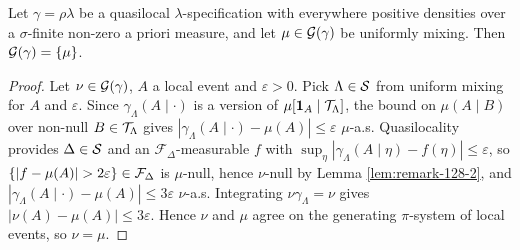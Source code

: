 \begin{proposition}[Georgii (7.11)(a)]
    \label{prop:ext-711a}
    \leanok

    Let $\gamma = \rho\lambda$ be a quasilocal $\lambda$-specification with everywhere positive
    densities over a $\sigma$-finite non-zero a priori measure, and let $\mu \in \mathcal{G}(\gamma)$ be
    uniformly mixing. Then $\mathcal{G}(\gamma) = \left\{ \mu \right\}$.
\end{proposition}
\begin{proof}
    \leanok

    Let $\nu \in \mathcal{G}(\gamma)$, $A$ a local event and $\varepsilon > 0$. Pick $\Lambda \in \mathcal{S}$
    from uniform mixing for $A$ and $\varepsilon$. Since $\gamma_\Lambda(A \mid \cdot)$ is a
    version of $\mu[\mathbf{1}_A \mid \mathcal{T}_\Lambda]$, the bound on $\mu(A \mid B)$ over non-null
    $B \in \mathcal{T}_\Lambda$ gives $|\gamma_\Lambda(A \mid \cdot) - \mu(A)| \le \varepsilon$
    $\mu$-a.s. Quasilocality provides $\Delta \in \mathcal{S}$ and an $\mathcal F_\Delta$-measurable $f$
    with $\sup_\eta |\gamma_\Lambda(A \mid \eta) - f(\eta)| \le \varepsilon$, so
    $\left\{ |f - \mu(A)| > 2\varepsilon \right\} \in \mathcal F_\Delta$ is $\mu$-null, hence $\nu$-null by
    Lemma \ref{lem:remark-128-2}, and $|\gamma_\Lambda(A \mid \cdot) - \mu(A)| \le 3\varepsilon$
    $\nu$-a.s. Integrating $\nu\gamma_\Lambda = \nu$ gives $|\nu(A) - \mu(A)| \le 3\varepsilon$.
    Hence $\nu$ and $\mu$ agree on the generating $\pi$-system of local events, so $\nu = \mu$.
\end{proof}

